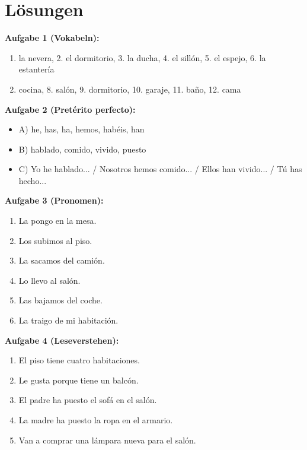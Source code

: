\documentclass[11pt, a4paper]{article}
\begin{document}

\section*{Lösungen}

\textbf{Aufgabe 1 (Vokabeln):}
\begin{enumerate}[leftmargin=1.5em, itemsep=0pt]
    \item la nevera, 2. el dormitorio, 3. la ducha, 4. el sillón, 5. el espejo, 6. la estantería
    \item cocina, 8. salón, 9. dormitorio, 10. garaje, 11. baño, 12. cama
\end{enumerate}

\textbf{Aufgabe 2 (Pretérito perfecto):}
\begin{itemize}[leftmargin=1.5em, itemsep=0pt]
    \item A) he, has, ha, hemos, habéis, han
    \item B) hablado, comido, vivido, puesto
    \item C) Yo he hablado... / Nosotros hemos comido... / Ellos han vivido... / Tú has hecho...
\end{itemize}

\textbf{Aufgabe 3 (Pronomen):}
\begin{enumerate}[label=\alph*), leftmargin=1.5em, itemsep=0pt]
    \item La pongo en la mesa.
    \item Los subimos al piso.
    \item La sacamos del camión.
    \item Lo llevo al salón.
    \item Las bajamos del coche.
    \item La traigo de mi habitación.
\end{enumerate}

\textbf{Aufgabe 4 (Leseverstehen):}
\begin{enumerate}[label=\alph*), leftmargin=1.5em, itemsep=0pt]
    \item El piso tiene cuatro habitaciones.
    \item Le gusta porque tiene un balcón.
    \item El padre ha puesto el sofá en el salón.
    \item La madre ha puesto la ropa en el armario.
    \item Van a comprar una lámpara nueva para el salón.
\end{enumerate}
\end{document}
